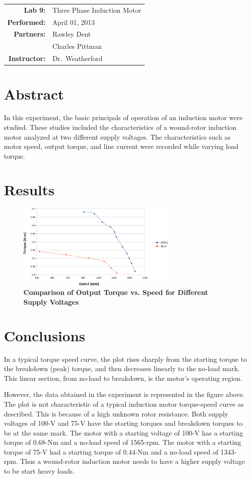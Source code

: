 \documentclass{article}
\begin{document}
\begin{tabular}{rl}
\textbf{Lab 9:} & Three Phase Induction Motor\\
\textbf{Performed:} & April 01, 2013 \\
\textbf{Partners:} & Rawley Dent \\ & Charles Pittman \\
\textbf{Instructor:} & Dr.\ Weatherford
\end{tabular}


\section*{Abstract}

In this experiment, the basic principals of operation of an induction motor
were studied.  These studies included the characteristics of a wound-rotor
induction motor analyzed at two different supply voltages.  The characteristics
such as motor speed, output torque, and line current were recorded while
varying load torque.

\section*{Results}

\begin{figure}[H]
\centering
\includegraphics[width=0.7\textwidth]{img/graph}
\caption{\textbf{Comparison of Output Torque vs. Speed for Different Supply Voltages}}
\label{fig:graph}
\end{figure}

\section*{Conclusions}

In a typical torque speed curve, the plot rises sharply from the starting
torque to the breakdown (peak) torque, and then decreases linearly to the
no-load mark. This linear section, from no-load to breakdown, is the motor's
operating region.

However, the data obtained in the experiment is represented
in the figure above. The plot is not characteristic of a typical induction
motor torque-speed curve as described.  This is because of a high unknown rotor
resistance. Both supply voltages of 100-V and 75-V have the starting torques
and breakdown torques to be at the same mark. The motor with a starting voltage
of 100-V has a starting torque of 0.68-Nm and a no-load speed of 1565-rpm.  The
motor with a starting torque of 75-V had a starting torque of 0.44-Nm and a
no-load speed of 1343-rpm. Thus a wound-rotor induction motor needs to have a
higher supply voltage to be start heavy loads.
\end{document}
